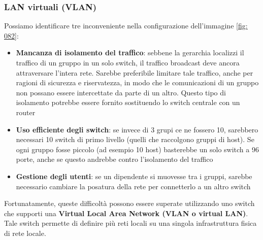 \documentclass[11pt,a4paper]{article}
\begin{document}
\subsubsection{LAN virtuali (VLAN)}
Possiamo identificare tre inconveniente nella configurazione dell'immagine \ref{fig: 082}:
\begin{itemize}
	\item \textbf{Mancanza di isolamento del traffico}: sebbene la gerarchia localizzi il traffico di un gruppo in un solo switch, il traffico broadcast deve ancora attraversare l'intera rete. Sarebbe preferibile limitare tale traffico, anche per ragioni di sicurezza e riservatezza, in modo che le comunicazioni di un gruppo non possano essere intercettate da parte di un altro. Questo tipo di isolamento potrebbe essere fornito sostituendo lo switch centrale con un router
	\item \textbf{Uso efficiente degli switch}: se invece di 3 grupi ce ne fossero 10, sarebbero necessari 10 switch di primo livello (quelli che raccolgono gruppi di host). Se ogni gruppo fosse piccolo (ad esempio 10 host) basterebbe un solo switch a 96 porte, anche se questo andrebbe contro l'isolamento del traffico
	\item \textbf{Gestione degli utenti}: se un dipendente si muovesse tra i gruppi, sarebbe necessario cambiare la posatura della rete per connetterlo a un altro switch
\end{itemize}
Fortunatamente, queste difficoltà possono essere superate utilizzando uno switch che supporti una \textbf{Virtual Local Area Network (VLAN o virtual LAN)}. Tale switch permette di definire più reti locali su una singola infrastruttura fisica di rete locale.
\end{document}
